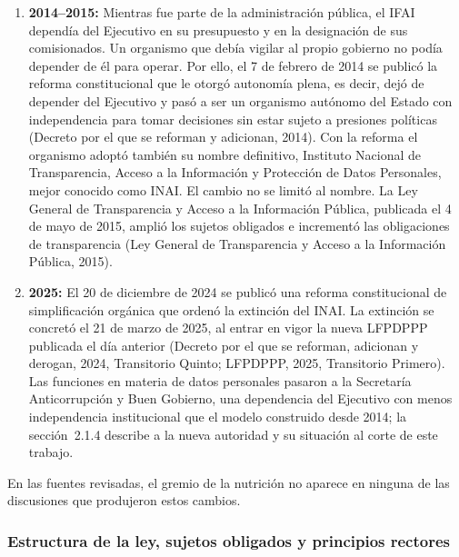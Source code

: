 \documentclass[12pt, a4paper]{article}
\begin{document}
\begin{enumerate}[label=\Roman*.]
  \item \textbf{2014--2015:} Mientras fue parte de la administración
  pública, el IFAI dependía del Ejecutivo en su presupuesto y en la
  designación de sus comisionados. Un organismo que debía vigilar al
  propio gobierno no podía depender de él para operar. Por ello, el
  7 de febrero de 2014 se publicó la reforma constitucional que le
  otorgó autonomía plena, es decir, dejó de depender del Ejecutivo y
  pasó a ser un organismo autónomo del Estado con independencia para
  tomar decisiones sin estar sujeto a presiones políticas (Decreto
  por el que se reforman y adicionan, 2014). Con la reforma el
  organismo adoptó también su nombre definitivo, Instituto Nacional
  de Transparencia, Acceso a la Información y Protección de Datos
  Personales, mejor conocido como INAI. El cambio no se limitó al
  nombre. La Ley General de Transparencia y Acceso a la Información
  Pública, publicada el 4 de mayo de 2015, amplió los sujetos
  obligados e incrementó las obligaciones de transparencia (Ley
  General de Transparencia y Acceso a la Información Pública, 2015).
 
  \item \textbf{2025:} El 20 de diciembre de 2024 se publicó una
  reforma constitucional de simplificación orgánica que ordenó la
  extinción del INAI. La extinción se concretó el 21 de marzo de
  2025, al entrar en vigor la nueva LFPDPPP publicada el día anterior
  (Decreto por el que se reforman, adicionan y derogan, 2024, Transitorio Quinto; LFPDPPP, 2025, Transitorio Primero). Las funciones en
  materia de datos personales pasaron a la Secretaría Anticorrupción
  y Buen Gobierno, una dependencia del Ejecutivo con menos
  independencia institucional que el modelo construido desde 2014;
  la sección~2.1.4 describe a la nueva autoridad y su situación al
  corte de este trabajo.
 
\end{enumerate}
 
En las fuentes revisadas, el gremio de la nutrición no aparece en
ninguna de las discusiones que produjeron estos cambios.
 
\subsubsection{Estructura de la ley, sujetos obligados y principios
rectores}
 
\end{document}
